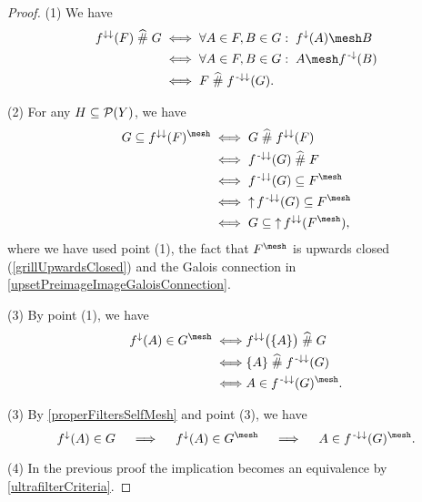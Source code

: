 \begin{proof}
(1) We have
\begin{align*}
f^{\imf\imf}(F) \amesh G &\iff \forall A\in F, B\in G:\; f^{\imf}(A) \mesh B \\
&\iff \forall A\in F, B\in G:\; A \mesh f^\preimf(B) \\
&\iff F \amesh f^{\preimf\imf}(G).
\end{align*}

(2) For any $H\subseteq \operatorname{\mathcal{P}}(Y)$, we have
\begin{align*}
G\subseteq f^{\imf\imf}(F)^\mesh &\iff G \amesh f^{\imf\imf}(F) \\
&\iff f^{\preimf\imf}(G)\amesh F \\
&\iff f^{\preimf\imf}(G) \subseteq F^\mesh \\
&\iff \upset f^{\preimf\imf}(G) \subseteq F^\mesh \\
&\iff G \subseteq \upset f^{\imf\imf}(F^\mesh),
\end{align*}
where we have used point (1), the fact that $F^\mesh$ is upwards closed (\ref{grillUpwardsClosed}) and the Galois connection in \ref{upsetPreimageImageGaloisConnection}.

(3) By point (1), we have
\begin{align*}
f^\imf(A)\in G^\mesh \iff& f^{\imf\imf}\big(\{A\}\big)\amesh G \\
\iff& \{A\} \amesh f^{\preimf\imf}(G) \\
\iff& A \in f^{\preimf\imf}(G)^\mesh.
\end{align*}

(3) By \ref{properFiltersSelfMesh} and point (3), we have
\[ f^\imf(A)\in G \quad\implies\quad  f^\imf(A)\in G^\mesh \quad\implies\quad  A \in f^{\preimf\imf}(G)^\mesh. \]

(4) In the previous proof the implication becomes an equivalence by \ref{ultrafilterCriteria}.
\end{proof}

